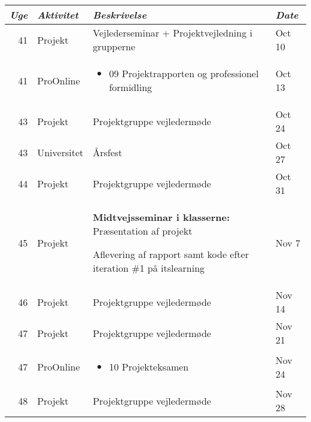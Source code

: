 \begin{longtable}{|r|l|p{}|l|}
  \hline
  \emph{Uge} & \emph{Aktivitet} & \emph{Beskrivelse} & \emph{Date} \\
  \hline
  41 & Projekt & Vejlederseminar + Projektvejledning i grupperne & Oct 10 \\
  \hline
  41 & ProOnline & \begin{itemize}[noitemsep,leftmargin=*,topsep=0pt,partopsep=0pt]

  \item 09 Projektrapporten og professionel formidling

\end{itemize} & Oct 13 \\
  \hline
  43 & Projekt & Projektgruppe vejledermøde & Oct 24 \\
  \hline
  43 & Universitet & Årsfest & Oct 27 \\
  \hline
  44 & Projekt & Projektgruppe vejledermøde & Oct 31 \\
  \hline
  45 & Projekt & \textbf{Midtvejsseminar i klasserne:} Præsentation af projekt

Aflevering af rapport samt kode efter iteration \#1 på itslearning & Nov 7 \\
  \hline
  46 & Projekt & Projektgruppe vejledermøde & Nov 14 \\
  \hline
  47 & Projekt & Projektgruppe vejledermøde & Nov 21 \\
  \hline
  47 & ProOnline & \begin{itemize}[noitemsep,leftmargin=*,topsep=0pt,partopsep=0pt]

  \item 10 Projekteksamen

\end{itemize} & Nov 24 \\
  \hline
  48 & Projekt & Projektgruppe vejledermøde & Nov 28 \\
  \hline
\end{longtable}
